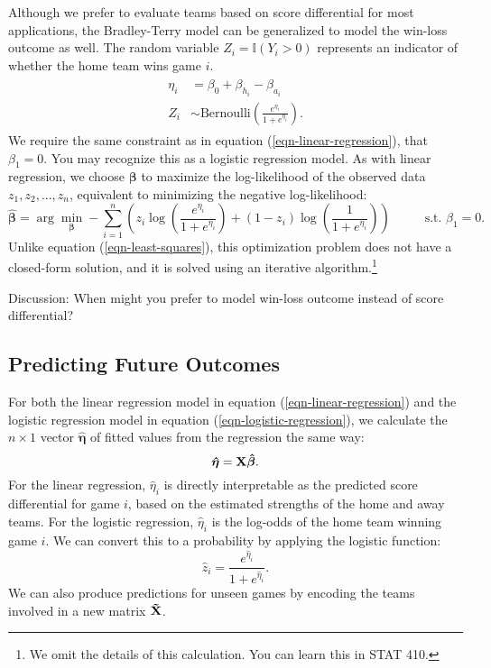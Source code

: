 \documentclass{article}
\begin{document}
  Although we prefer to evaluate teams based on score differential for most applications, the Bradley-Terry model can be generalized to model the win-loss outcome as well. The random variable $Z_i = \mathbb{I}(Y_i > 0)$ represents an indicator of whether the home team wins game $i$.
  \begin{align}
    \label{eqn-logistic-regression}
    \begin{split}
      \eta_i &= \beta_0 + \beta_{h_i} - \beta_{a_i}\\
      Z_i &\sim \mbox{Bernoulli}\left(\frac{e^{\eta_i}}{1 + e^{\eta_i}}\right).
    \end{split}
  \end{align}
  We require the same constraint as in equation (\ref{eqn-linear-regression}), that $\beta_1 = 0$. You may recognize this as a logistic regression model. As with linear regression, we choose $\boldsymbol{\beta}$ to maximize the log-likelihood of the observed data $z_1, z_2, ..., z_n$, equivalent to minimizing the negative log-likelihood:
  \begin{equation*}
    \boldsymbol{\hat\beta} = \arg\min_{\boldsymbol{\beta}} -\sum_{i=1}^n \left(z_i \log\left(\frac{e^{\eta_i}}{1 + e^{\eta_i}}\right) + (1 - z_i) \log\left(\frac{1}{1 + e^{\eta_i}}\right)\right) \hspace{1cm} \mbox{ s.t. } \beta_1 = 0.
  \end{equation*}
  Unlike equation (\ref{eqn-least-squares}), this optimization problem does not have a closed-form solution, and it is solved using an iterative algorithm.\footnote{We omit the details of this calculation. You can learn this in STAT 410.}

  \begin{framed}
    {\sc Discussion:} When might you prefer to model win-loss outcome instead of score differential?
  \end{framed}

  \subsection{\sc Predicting Future Outcomes}

  For both the linear regression model in equation (\ref{eqn-linear-regression}) and the logistic regression model in equation (\ref{eqn-logistic-regression}), we calculate the $n \times 1$ vector $\boldsymbol{\hat\eta}$ of fitted values from the regression the same way:
  \begin{equation*}
    \boldsymbol{\hat\eta} = {\bf X} \boldsymbol{\hat\beta}.
  \end{equation*}
  For the linear regression, $\hat\eta_i$ is directly interpretable as the predicted score differential for game $i$, based on the estimated strengths of the home and away teams. For the logistic regression, $\hat\eta_i$ is the log-odds of the home team winning game $i$. We can convert this to a probability by applying the logistic function:
  \begin{equation*}
    \hat z_i = \frac{e^{\hat\eta_i}}{1 + e^{\hat\eta_i}}.
  \end{equation*}
  We can also produce predictions for unseen games by encoding the teams involved in a new matrix ${\bf \tilde X}$.
\end{document}
